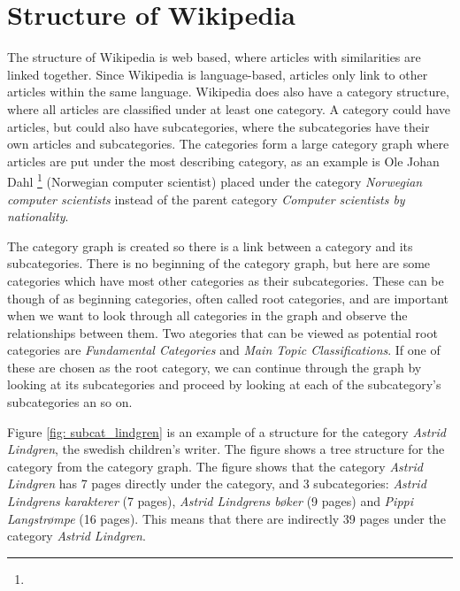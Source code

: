 \documentclass[english,a4paper]{ifimaster}
\begin{document}
\chapter{Structure of Wikipedia}
The structure of Wikipedia is web based, where articles with similarities are linked together. Since Wikipedia is language-based, articles only link to other articles within the same language. Wikipedia does also have a category structure, where all articles are classified under at least one category. A category could have articles, but could also have subcategories, where the subcategories have their own articles and subcategories. The categories form a large category graph where articles are put under the most describing category, as an example is Ole Johan Dahl \footnote{\olejohandahleng} (Norwegian computer scientist) placed under the category \textit{Norwegian computer scientists} instead of the parent category \textit{Computer scientists by nationality}. 

The category graph is created so there is a link between a category and its subcategories. There is no beginning of the category graph, but here are some categories which have most other categories as their subcategories. These can be though of as beginning categories, often called root categories, and are important when we want to look through all categories in the graph and observe the relationships between them.  Two ategories that can be viewed as potential root categories are \textit{Fundamental Categories} and \textit{Main Topic Classifications}. If one of these are chosen as the root category, we can continue through the graph by looking at its subcategories and proceed by looking at each of the subcategory's subcategories an so on.

Figure \ref{fig: subcat_lindgren} is an example of a structure for the category \textit{Astrid Lindgren}, the swedish children's writer. The figure shows a tree structure for the category from the category graph. The figure shows that the category \textit{Astrid Lindgren} has 7 pages directly under the category, and 3 subcategories: \textit{Astrid Lindgrens karakterer} (7 pages), \textit{Astrid Lindgrens bøker} (9 pages) and \textit{Pippi Langstrømpe} (16 pages).  This means that there are indirectly 39 pages under the category \textit{Astrid Lindgren}. 


\end{document}
